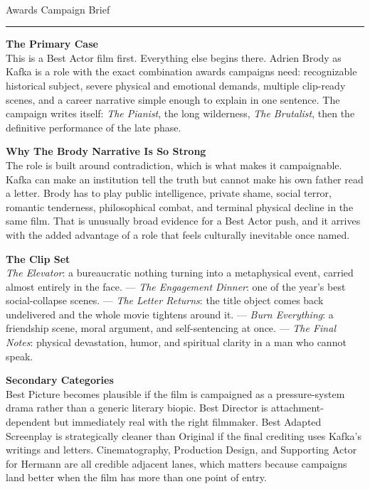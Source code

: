 \documentclass[11pt,letterpaper]{article}
\begin{document}
\begin{center}
{\Large\bfseries\sffamily \filmtitleupper}\\[3pt]
{\normalsize\sffamily\color{kafkagray} Awards Campaign Brief}
\end{center}
\vspace{2pt}
\textcolor{sectionrule}{\rule{\textwidth}{0.5pt}}
\vspace{4pt}

\textbf{The Primary Case}\\
This is a Best Actor film first. Everything else begins there. Adrien Brody as Kafka is a role with the exact combination awards campaigns need: recognizable historical subject, severe physical and emotional demands, multiple clip-ready scenes, and a career narrative simple enough to explain in one sentence. The campaign writes itself: \textit{The Pianist}, the long wilderness, \textit{The Brutalist}, then the definitive performance of the late phase.

\vspace{2pt}

\textbf{Why The Brody Narrative Is So Strong}\\
The role is built around contradiction, which is what makes it campaignable. Kafka can make an institution tell the truth but cannot make his own father read a letter. Brody has to play public intelligence, private shame, social terror, romantic tenderness, philosophical combat, and terminal physical decline in the same film. That is unusually broad evidence for a Best Actor push, and it arrives with the added advantage of a role that feels culturally inevitable once named.

\vspace{2pt}

\textbf{The Clip Set}\\
\textit{The Elevator}: a bureaucratic nothing turning into a metaphysical event, carried almost entirely in the face. --- \textit{The Engagement Dinner}: one of the year's best social-collapse scenes. --- \textit{The Letter Returns}: the title object comes back undelivered and the whole movie tightens around it. --- \textit{Burn Everything}: a friendship scene, moral argument, and self-sentencing at once. --- \textit{The Final Notes}: physical devastation, humor, and spiritual clarity in a man who cannot speak.

\vspace{2pt}

\textbf{Secondary Categories}\\
Best Picture becomes plausible if the film is campaigned as a pressure-system drama rather than a generic literary biopic. Best Director is attachment-dependent but immediately real with the right filmmaker. Best Adapted Screenplay is strategically cleaner than Original if the final crediting uses Kafka's writings and letters. Cinematography, Production Design, and Supporting Actor for Hermann are all credible adjacent lanes, which matters because campaigns land better when the film has more than one point of entry.
\end{document}
